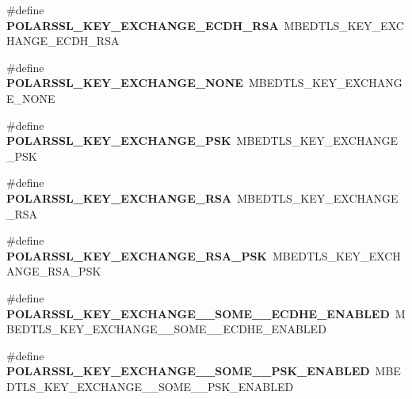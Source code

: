 \begin{DoxyCompactItemize}
\#define {\bfseries P\+O\+L\+A\+R\+S\+S\+L\+\_\+\+K\+E\+Y\+\_\+\+E\+X\+C\+H\+A\+N\+G\+E\+\_\+\+E\+C\+D\+H\+\_\+\+R\+SA}~M\+B\+E\+D\+T\+L\+S\+\_\+\+K\+E\+Y\+\_\+\+E\+X\+C\+H\+A\+N\+G\+E\+\_\+\+E\+C\+D\+H\+\_\+\+R\+SA
\item 
\mbox{\label{compat-1_83_8h_af16b9e25fe667ed8eab6fb64fd459619}} 
\#define {\bfseries P\+O\+L\+A\+R\+S\+S\+L\+\_\+\+K\+E\+Y\+\_\+\+E\+X\+C\+H\+A\+N\+G\+E\+\_\+\+N\+O\+NE}~M\+B\+E\+D\+T\+L\+S\+\_\+\+K\+E\+Y\+\_\+\+E\+X\+C\+H\+A\+N\+G\+E\+\_\+\+N\+O\+NE
\item 
\mbox{\label{compat-1_83_8h_aaa34ecd8b8160a7e02ad2a041bd0b413}} 
\#define {\bfseries P\+O\+L\+A\+R\+S\+S\+L\+\_\+\+K\+E\+Y\+\_\+\+E\+X\+C\+H\+A\+N\+G\+E\+\_\+\+P\+SK}~M\+B\+E\+D\+T\+L\+S\+\_\+\+K\+E\+Y\+\_\+\+E\+X\+C\+H\+A\+N\+G\+E\+\_\+\+P\+SK
\item 
\mbox{\label{compat-1_83_8h_a775c8acc2f0c6ebc3fcaeea72fa80c2a}} 
\#define {\bfseries P\+O\+L\+A\+R\+S\+S\+L\+\_\+\+K\+E\+Y\+\_\+\+E\+X\+C\+H\+A\+N\+G\+E\+\_\+\+R\+SA}~M\+B\+E\+D\+T\+L\+S\+\_\+\+K\+E\+Y\+\_\+\+E\+X\+C\+H\+A\+N\+G\+E\+\_\+\+R\+SA
\item 
\mbox{\label{compat-1_83_8h_aa5bfc59ecf6d4f1098c01bb505a0cbf0}} 
\#define {\bfseries P\+O\+L\+A\+R\+S\+S\+L\+\_\+\+K\+E\+Y\+\_\+\+E\+X\+C\+H\+A\+N\+G\+E\+\_\+\+R\+S\+A\+\_\+\+P\+SK}~M\+B\+E\+D\+T\+L\+S\+\_\+\+K\+E\+Y\+\_\+\+E\+X\+C\+H\+A\+N\+G\+E\+\_\+\+R\+S\+A\+\_\+\+P\+SK
\item 
\mbox{\label{compat-1_83_8h_a866cdf579717ed3480366ce9afc93d8b}} 
\#define {\bfseries P\+O\+L\+A\+R\+S\+S\+L\+\_\+\+K\+E\+Y\+\_\+\+E\+X\+C\+H\+A\+N\+G\+E\+\_\+\+\_\+\+S\+O\+M\+E\+\_\+\+\_\+\+E\+C\+D\+H\+E\+\_\+\+E\+N\+A\+B\+L\+ED}~M\+B\+E\+D\+T\+L\+S\+\_\+\+K\+E\+Y\+\_\+\+E\+X\+C\+H\+A\+N\+G\+E\+\_\+\+\_\+\+S\+O\+M\+E\+\_\+\+\_\+\+E\+C\+D\+H\+E\+\_\+\+E\+N\+A\+B\+L\+ED
\item 
\mbox{\label{compat-1_83_8h_a1043bbbffe63041fc0ba8755ed4c7d98}} 
\#define {\bfseries P\+O\+L\+A\+R\+S\+S\+L\+\_\+\+K\+E\+Y\+\_\+\+E\+X\+C\+H\+A\+N\+G\+E\+\_\+\+\_\+\+S\+O\+M\+E\+\_\+\+\_\+\+P\+S\+K\+\_\+\+E\+N\+A\+B\+L\+ED}~M\+B\+E\+D\+T\+L\+S\+\_\+\+K\+E\+Y\+\_\+\+E\+X\+C\+H\+A\+N\+G\+E\+\_\+\+\_\+\+S\+O\+M\+E\+\_\+\+\_\+\+P\+S\+K\+\_\+\+E\+N\+A\+B\+L\+ED

\end{DoxyCompactItemize}
